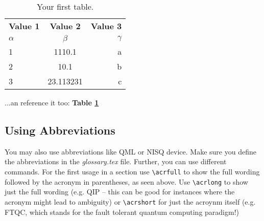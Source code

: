 \begin{table}[h!]
  \begin{center}
    \caption{Your first table.}
    \label{tab:table1}
    \begin{tabular}{l|c|r} %
      \textbf{Value 1} & \textbf{Value 2} & \textbf{Value 3}\\
      $\alpha$ & $\beta$ & $\gamma$ \\
      \hline
      1 & 1110.1 & a\\
      2 & 10.1 & b\\
      3 & 23.113231 & c\\
    \end{tabular}
    \label{table:table1}
  \end{center}
\end{table}

...an reference it too: \textbf{Table \ref{table:table1}}


\subsection{Using Abbreviations}

You may also use abbreviations like \acrfull{QML} or \acrfull{NISQ} device. Make sure you define the abbreviations in the \textit{glossary.tex} file. Further, you can use different commands. For the first usage in a section use \verb|\acrfull| to show the full wording followed by the acronym in parentheses, as seen above. Use \verb|\acrlong| to show just the full wording (e.g. \acrlong{QIP} – this can be good for instances where the acronym might lead to ambiguity) or \verb|\acrshort| for just the acroynm itself (e.g. \acrshort{FTQC}, which stands for the fault tolerant quantum computing paradigm!)